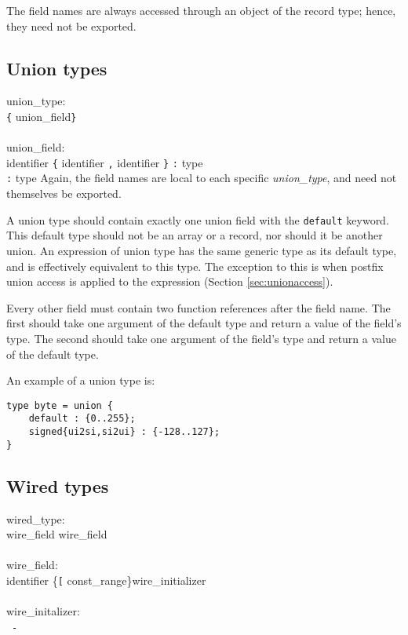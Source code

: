 The field names are always accessed through an object of the record type;
hence, they need not be exported.

\subsection{Union types}\label{sec:union}

\grammarstart
union\_type: \\
       \verb|{| union\_field\TSEQ \verb|}| \\
 \\
union\_field: \\
       \>identifier \verb|{| identifier {\tt{},} identifier \verb|}| {\tt{}:} type \\
\orbox {} {\tt{}:} type
\grammarend
Again, the field names are local to each specific {\it{}union\_type}, and need
not themselves be exported.

A union type should contain exactly one union field with the {\tt{}default}
keyword.  This default type should not be an array or a record, nor should
it be another union.  An expression of union type has the same generic type
as its default type, and is effectively equivalent to this type.  The exception
to this is when postfix union access is applied to the expression
(Section \ref{sec:unionaccess}).

Every other field must contain two function references after the field name.
The first should take one argument of the default type and return a value of
the field's type.  The second should take one argument of the field's type
and return a value of the default type.

An example of a union type is:
\begin{verbatim}
type byte = union {
    default : {0..255};
    signed{ui2si,si2ui} : {-128..127};
}
\end{verbatim}

\subsection{Wired types}\label{sec:wired}

\grammarstart
wired\_type: \\
      \>{\tt{}(} wire\_field\LIST {\tt{};} wire\_field\LIST {\tt{})} \\
 \\
wire\_field: \\
      \>identifier \{{\tt{}[} const\_range\LIST {\tt{}]}\}\OPT wire\_initializer\OPT \\
 \\
wire\_initalizer: \\
      \>{\tt{}+} \orbox \ {\tt{}-}
\grammarend

